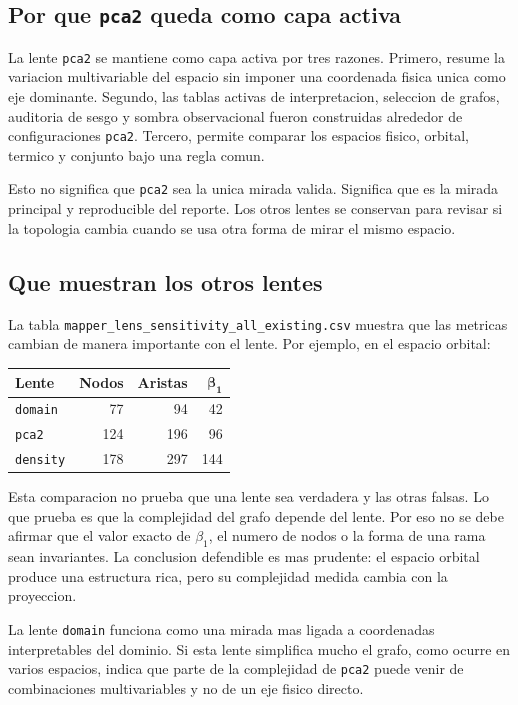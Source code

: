 \subsection*{Por que \texttt{pca2} queda como capa activa}

La lente \texttt{pca2} se mantiene como capa activa por tres razones. Primero, resume la variacion multivariable del espacio sin imponer una coordenada fisica unica como eje dominante. Segundo, las tablas activas de interpretacion, seleccion de grafos, auditoria de sesgo y sombra observacional fueron construidas alrededor de configuraciones \texttt{pca2}. Tercero, permite comparar los espacios fisico, orbital, termico y conjunto bajo una regla comun.

Esto no significa que \texttt{pca2} sea la unica mirada valida. Significa que es la mirada principal y reproducible del reporte. Los otros lentes se conservan para revisar si la topologia cambia cuando se usa otra forma de mirar el mismo espacio.

\subsection*{Que muestran los otros lentes}

La tabla \texttt{mapper\_lens\_sensitivity\_all\_existing.csv} muestra que las metricas cambian de manera importante con el lente. Por ejemplo, en el espacio orbital:

\begin{center}
\begin{tabular}{lrrr}
\toprule
\textbf{Lente} & \textbf{Nodos} & \textbf{Aristas} & $\boldsymbol{\beta_1}$ \\
\midrule
\texttt{domain} & 77 & 94 & 42 \\
\texttt{pca2} & 124 & 196 & 96 \\
\texttt{density} & 178 & 297 & 144 \\
\bottomrule
\end{tabular}
\end{center}

Esta comparacion no prueba que una lente sea verdadera y las otras falsas. Lo que prueba es que la complejidad del grafo depende del lente. Por eso no se debe afirmar que el valor exacto de $\beta_1$, el numero de nodos o la forma de una rama sean invariantes. La conclusion defendible es mas prudente: el espacio orbital produce una estructura rica, pero su complejidad medida cambia con la proyeccion.

La lente \texttt{domain} funciona como una mirada mas ligada a coordenadas interpretables del dominio. Si esta lente simplifica mucho el grafo, como ocurre en varios espacios, indica que parte de la complejidad de \texttt{pca2} puede venir de combinaciones multivariables y no de un eje fisico directo.

